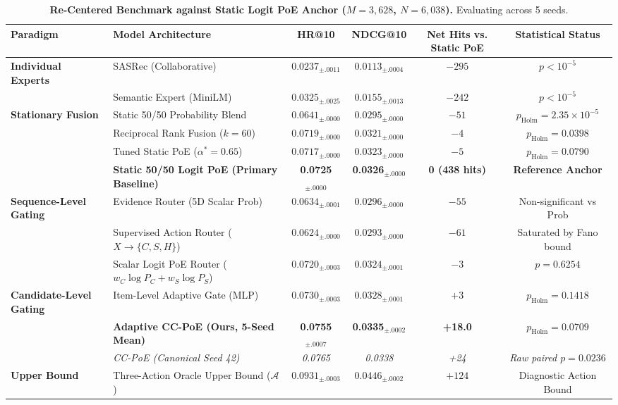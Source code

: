 \begin{table}[t]
\centering
\small
\caption{\textbf{Re-Centered Benchmark against Static Logit PoE Anchor ($M=3{,}628$, $N=6{,}038$).} Evaluating across 5 seeds.}
\label{tab:poe_benchmark}
\begin{tabular}{llcccc}
\toprule
\textbf{Paradigm} & \textbf{Model Architecture} & \textbf{HR@10} & \textbf{NDCG@10} & \textbf{Net Hits vs. Static PoE} & \textbf{Statistical Status} \\
\midrule
\textbf{Individual Experts} 
& SASRec (Collaborative) & $0.0237_{\pm .0011}$ & $0.0113_{\pm .0004}$ & $-295$ & $p < 10^{-5}$ \\
& Semantic Expert (MiniLM) & $0.0325_{\pm .0025}$ & $0.0155_{\pm .0013}$ & $-242$ & $p < 10^{-5}$ \\
\midrule
\textbf{Stationary Fusion} 
& Static 50/50 Probability Blend & $0.0641_{\pm .0000}$ & $0.0295_{\pm .0000}$ & $-51$ & $p_{\text{Holm}} = 2.35 \times 10^{-5}$ \\
& Reciprocal Rank Fusion ($k=60$) & $0.0719_{\pm .0000}$ & $0.0321_{\pm .0000}$ & $-4$ & $p_{\text{Holm}} = 0.0398$ \\
& Tuned Static PoE ($\alpha^*=0.65$) & $0.0717_{\pm .0000}$ & $0.0323_{\pm .0000}$ & $-5$ & $p_{\text{Holm}} = 0.0790$ \\
& \textbf{Static 50/50 Logit PoE (Primary Baseline)} & \textbf{0.0725}$_{\pm .0000}$ & \textbf{0.0326}$_{\pm .0000}$ & \textbf{0 (438 hits)} & \textbf{Reference Anchor} \\
\midrule
\textbf{Sequence-Level Gating} 
& Evidence Router (5D Scalar Prob) & $0.0634_{\pm .0001}$ & $0.0296_{\pm .0000}$ & $-55$ & Non-significant vs Prob \\
& Supervised Action Router ($X \to \{C, S, H\}$) & $0.0624_{\pm .0000}$ & $0.0293_{\pm .0000}$ & $-61$ & Saturated by Fano bound \\
& Scalar Logit PoE Router ($w_C \log P_C + w_S \log P_S$) & $0.0720_{\pm .0003}$ & $0.0324_{\pm .0001}$ & $-3$ & $p = 0.6254$ \\
\midrule
\textbf{Candidate-Level Gating} 
& Item-Level Adaptive Gate (MLP) & $0.0730_{\pm .0003}$ & $0.0328_{\pm .0001}$ & $+3$ & $p_{\text{Holm}} = 0.1418$ \\
& \textbf{Adaptive CC-PoE (Ours, 5-Seed Mean)} & \textbf{0.0755}$_{\pm .0007}$ & \textbf{0.0335}$_{\pm .0002}$ & \textbf{+18.0} & \textbf{$p_{\text{Holm}} = 0.0709$} \\
& \emph{CC-PoE (Canonical Seed 42)} & \emph{0.0765} & \emph{0.0338} & \emph{+24} & \emph{Raw paired $p = 0.0236$} \\
\midrule
\textbf{Upper Bound} 
& Three-Action Oracle Upper Bound ($\mathcal{A}$) & $\mathbf{0.0931}_{\pm .0003}$ & $\mathbf{0.0446}_{\pm .0002}$ & $+124$ & Diagnostic Action Bound \\
\bottomrule
\end{tabular}
\end{table}

